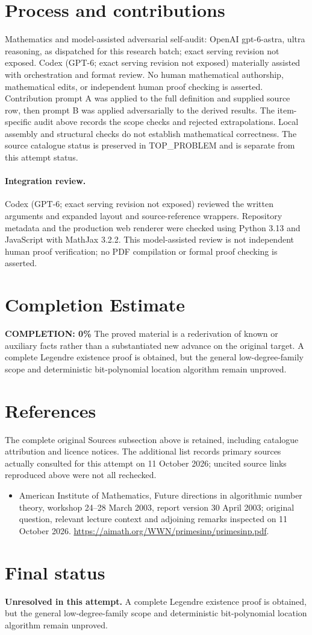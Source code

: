 \documentclass[11pt]{article}
\begin{document}
\section{Process and contributions}
Mathematics and model-assisted adversarial self-audit: OpenAI gpt-6-astra, ultra reasoning, as dispatched for this research batch; exact serving revision not exposed. Codex (GPT-6; exact serving revision not exposed) materially assisted with orchestration and format review. No human mathematical authorship, mathematical edits, or independent human proof checking is asserted.
Contribution prompt A was applied to the full definition and supplied source row, then prompt B was applied adversarially to the derived results. The item-specific audit above records the scope checks and rejected extrapolations. Local assembly and structural checks do not establish mathematical correctness. The source catalogue status is preserved in TOP\_PROBLEM and is separate from this attempt status.
\paragraph{Integration review.} Codex (GPT-6; exact serving revision not exposed) reviewed the written arguments and expanded layout and source-reference wrappers. Repository metadata and the production web renderer were checked using Python 3.13 and JavaScript with MathJax 3.2.2. This model-assisted review is not independent human proof verification; no PDF compilation or formal proof checking is asserted.

\section{Completion Estimate}
\noindent\textbf{COMPLETION: 0\%}
The proved material is a rederivation of known or auxiliary facts rather than a substantiated new advance on the original target. A complete Legendre existence proof is obtained, but the general low-degree-family scope and deterministic bit-polynomial location algorithm remain unproved.
\section{References}
The complete original Sources subsection above is retained, including catalogue attribution and licence notices. The additional list records primary sources actually consulted for this attempt on 11 October 2026; uncited source links reproduced above were not all rechecked.
\begin{itemize}
\item American Institute of Mathematics, Future directions in algorithmic number theory, workshop 24--28 March 2003, report version 30 April 2003; original question, relevant lecture context and adjoining remarks inspected on 11 October 2026. \url{https://aimath.org/WWN/primesinp/primesinp.pdf}.
\end{itemize}
\section{Final status}
\textbf{Unresolved in this attempt.} A complete Legendre existence proof is obtained, but the general low-degree-family scope and deterministic bit-polynomial location algorithm remain unproved.
\end{document}
